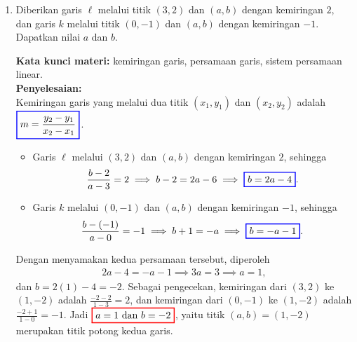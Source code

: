 \documentclass[10pt,openany,a4paper]{article}
\theoremstyle{definition}
\theoremstyle{definition}
\theoremstyle{plain}
\newenvironment{jawab}[2][tes]{%
\par\noindent\textbf{Kata kunci materi:} #1.\\
\textbf{Penyelesaian:} #2%
}{}
\begin{document}
\newpage

\begin{enumerate}
    \item Diberikan garis $\ell$ melalui titik $(3,2)$ dan $(a,b)$ dengan kemiringan $2$, dan garis $k$ melalui titik $(0,-1)$ dan $(a,b)$ dengan kemiringan $-1$. Dapatkan nilai $a$ dan $b$.
    \begin{jawab}[kemiringan garis, persamaan garis, sistem persamaan linear]{~\\
        Kemiringan garis yang melalui dua titik $(x_1,y_1)$ dan $(x_2,y_2)$ adalah $\colorlet{oldcolor}{.}
        \color{blue}
        \setlength{\fboxrule}{1pt} \boxed{\color{oldcolor}m = \frac{y_2 - y_1}{x_2 - x_1}}\color{oldcolor}$.
        \begin{itemize}
            \item Garis $\ell$ melalui $(3,2)$ dan $(a,b)$ dengan kemiringan $2$, sehingga
            \begin{align*}
                \frac{b-2}{a-3} = 2 \implies b-2 = 2a-6 \implies \colorlet{oldcolor}{.}
        \color{blue}
        \setlength{\fboxrule}{1pt} \boxed{\color{oldcolor}b = 2a-4}\color{oldcolor}.
            \end{align*}
            \item Garis $k$ melalui $(0,-1)$ dan $(a,b)$ dengan kemiringan $-1$, sehingga
            \begin{align*}
                \frac{b-(-1)}{a-0} = -1 \implies b+1 = -a \implies \colorlet{oldcolor}{.}
        \color{blue}
        \setlength{\fboxrule}{1pt} \boxed{\color{oldcolor}b = -a-1}\color{oldcolor}.
            \end{align*}
        \end{itemize}
        Dengan menyamakan kedua persamaan tersebut, diperoleh
        \begin{align*}
            2a-4 = -a-1 \implies 3a = 3 \implies a = 1,
        \end{align*}
        dan $b=2(1)-4=-2$. Sebagai pengecekan, kemiringan dari $(3,2)$ ke $(1,-2)$ adalah $\frac{-2-2}{1-3}=2$, dan kemiringan dari $(0,-1)$ ke $(1,-2)$ adalah $\frac{-2+1}{1-0}=-1$. Jadi $\colorlet{oldcolor}{.}
        \color{red}
        \setlength{\fboxrule}{1pt} \boxed{\color{oldcolor}a=1 \text{ dan } b=-2}\color{oldcolor}$, yaitu titik $(a,b)=(1,-2)$ merupakan titik potong kedua garis.
    }
    \end{jawab}


\end{enumerate}
\end{document}
